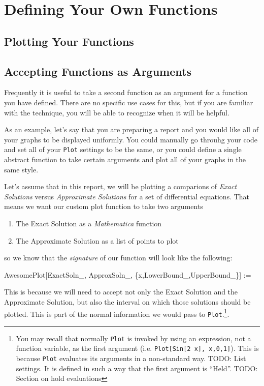 \chapter{Defining Your Own Functions}
\label{chap:Functions}

\section{Plotting Your Functions}

\section{Accepting Functions as Arguments}

Frequently it is useful to take a second function as an argument for a function you have defined. There are no specific use cases for this, but if you are familiar with the technique, you will be able to recognize when it will be helpful.

As an example, let's say that you are preparing a report and you would like all of your graphs to be displayed uniformly. You could manually go throuhg your code and set all of your \texttt{Plot} settings to be the same, or you could define a single abstract function to take certain arguments and plot all of your graphs in the same style.

Let's assume that in this report, we will be plotting a comparions of \emph{Exact Solutions} versus \emph{Approximate Solutions} for a set of differential equations. That means we want our custom plot function to take two arguments
\begin{enumerate}
	   \item The Exact Solution as a \emph{Mathematica} function
	   \item The Approximate Solution as a list of points to plot
\end{enumerate}
so we know that the \emph{signature} of our function will look like the following:
\begin{code}
	   AwesomePlot[ExactSoln_, ApproxSoln_, \{x,LowerBound_,UpperBound_\}] :=
\end{code}

This is because we will need to accept not only the Exact Solution and the Approximate Solution, but also the interval on which those solutions should be plotted. This is part of the normal information we would pass to \texttt{Plot}.\footnote{You may recall that normally \texttt{Plot} is invoked by using an expression, not a function variable, as the first argument (i.e. \texttt{Plot[Sin[2 x], {x,0,1}]}). This is because \texttt{Plot} evaluates its arguments in a non-standard way. TODO: List settings. It is defined in such a way that the first argument is ``Held''. TODO: Section on hold evaluations}.
